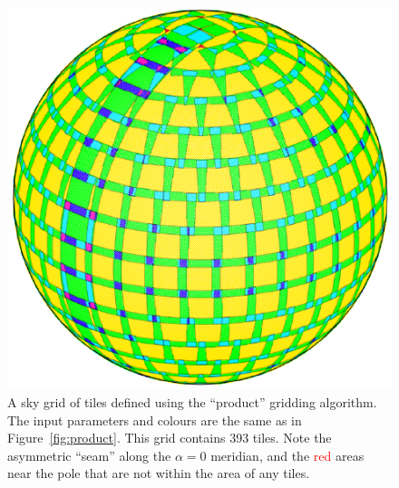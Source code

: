 \begin{colsection}
\begin{colsection}
\begin{figure}[p]
\begin{minipage}[c]{0.50\textwidth}
\caption[The ``cosine'' gridding algorithm]{A sky grid of tiles defined using the ``product'' gridding algorithm. The input parameters and colours are the same as in Figure~\ref{fig:product}. This grid contains 393 tiles. Note the asymmetric ``seam'' along the $\alpha=0$ meridian, and the \textcolor{red}{red} areas near the pole that are not within the area of any tiles.}
\label{fig:cosine}
\end{minipage}
\hfill
\begin{minipage}[c]{0.46\textwidth}
\includegraphics[width=\linewidth]{images/algo_cosine.pdf}
\end{minipage}
\end{figure}


\end{colsection}
\end{colsection}
